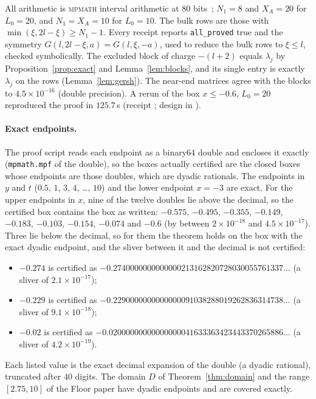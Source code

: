 \documentclass[11pt]{article}
\theoremstyle{definition}
\theoremstyle{remark}
\begin{document}
All arithmetic is \textsc{mpmath} interval arithmetic at $80$ bits~\cite{mpmath}; $N_1=8$ and $X_A=20$ for $L_0=20$, and
$N_1=X_A=10$ for $L_0=10$. The bulk rows are those with $\min(\xi,2l-\xi)\ge N_1-1$. Every receipt reports
\texttt{all\_proved} true and the symmetry $G(l,2l-\xi,a)=G(l,\xi,-a)$, used to reduce the bulk rows to $\xi\le l$,
checked symbolically. The excluded block of charge $-(l+2)$ equals $\lambda_j$ by Proposition~\ref{prop:exact} and
Lemma~\ref{lem:blocks}, and its single entry is exactly $\lambda_j$ on the rows (Lemma~\ref{lem:gersh}). The near-end
matrices agree with the blocks to $4.5\times10^{-16}$ (double precision). A rerun of the box $x\le-0.6$, $L_0=20$
reproduced the proof in $125.7$\,s (receipt ; design in
). \paragraph{Exact endpoints.} The proof script reads each endpoint as a binary64 double and encloses it exactly
(\texttt{mpmath.mpf} of the double), so the boxes actually certified are the closed boxes whose endpoints are those
doubles, which are dyadic rationals. The endpoints in $y$ and $t$ ($0.5$, $1$, $3$, $4$, \dots, $10$) and the lower
endpoint $x=-3$ are exact. For the upper endpoints in $x$, nine of the twelve doubles lie above the decimal, so the
certified box contains the box as written: $-0.575$, $-0.495$, $-0.355$, $-0.149$, $-0.183$, $-0.103$, $-0.154$,
$-0.074$ and $-0.6$ (by between $2\times10^{-18}$ and $4.5\times10^{-17}$). Three lie below the decimal, so for them
the theorem holds on the box with the exact dyadic endpoint, and the sliver between it and the decimal is not certified:
\begin{itemize}
  \item $-0.274$ is certified as $-0.2740000000000000213162820728030055761337\ldots$ (a sliver of $2.1\times10^{-17}$);
  \item $-0.229$ is certified as $-0.2290000000000000091038288019262836314738\ldots$ (a sliver of $9.1\times10^{-18}$);
  \item $-0.02$ is certified as $-0.02000000000000000041633363423443370265886\ldots$ (a sliver of $4.2\times10^{-19}$).
\end{itemize}
Each listed value is the exact decimal expansion of the double (a dyadic rational), truncated after $40$ digits. The
domain $D$ of Theorem~\ref{thm:domain} and the range $[2.75,10]$ of the Floor paper have dyadic endpoints and are
covered exactly.
\end{document}
